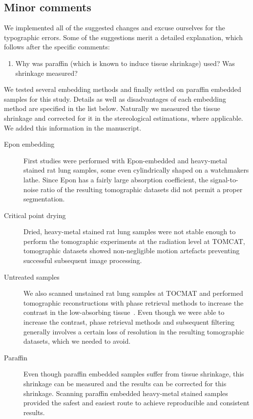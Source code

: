 \documentclass[english,paper=a4,DIV=calc]{scrartcl}
\begin{document}
\subsection{Minor comments}
We implemented all of the suggested changes and excuse ourselves for the typographic errors. Some of the suggestions merit a detailed explanation, which follows after the specific comments:

\begin{enumerate}[start=3]
	\item \textelp{} Why was paraffin (which is known to induce tissue shrinkage) used? Was shrinkage measured?
\end{enumerate}

We tested several embedding methods and finally settled on paraffin embedded samples for this study.
Details as well as disadvantages of each embedding method are specified in the list below.
Naturally we measured the tissue shrinkage and corrected for it in the stereological estimations, where applicable.
We added this information in the manuscript.

\begin{description}
	\item [Epon embedding] First studies were performed with Epon-embedded and heavy-metal stained rat lung samples, some even cylindrically shaped on a watchmakers lathe.
		Since Epon has a fairly large absorption coefficient, the signal-to-noise ratio of the resulting tomographic datasets did not permit a proper segmentation.
	\item [Critical point drying] Dried, heavy-metal stained rat lung samples were not stable enough to perform the tomographic experiments at the radiation level at TOMCAT, tomographic datasets showed non-negligible motion artefacts preventing successful subsequent image processing.
	\item [Untreated samples] We also scanned unstained rat lung samples at TOCMAT and performed tomographic reconstructions with phase retrieval methods to increase the contrast in the low-absorbing tissue~\citep{Marone2011}.
	Even though we were able to increase the contrast, phase retrieval methods and subsequent filtering generally involves a certain loss of resolution in the resulting tomographic datasets, which we needed to avoid.
	\item [Paraffin] Even though paraffin embedded samples suffer from tissue shrinkage, this shrinkage can be measured and the results can be corrected for this shrinkage.
	Scanning paraffin embedded heavy-metal stained samples provided the safest and easiest route to achieve reproducible and consistent results.
\end{description}
\end{document}
